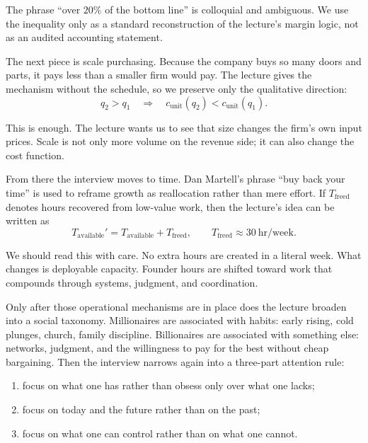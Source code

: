 \begin{remark}
The phrase ``over \(20\%\) of the bottom line'' is colloquial and ambiguous. We use the inequality only as a standard reconstruction of the lecture's margin logic, not as an audited accounting statement.
\end{remark}

The next piece is scale purchasing. Because the company buys so many doors and parts, it pays less than a smaller firm would pay. The lecture gives the mechanism without the schedule, so we preserve only the qualitative direction:
\begin{equation}
q_2 > q_1
\quad \Longrightarrow \quad
c_{\text{unit}}(q_2) < c_{\text{unit}}(q_1).
\end{equation}

This is enough. The lecture wants us to see that size changes the firm's own input prices. Scale is not only more volume on the revenue side; it can also change the cost function.

From there the interview moves to time. Dan Martell's phrase ``buy back your time'' is used to reframe growth as reallocation rather than mere effort. If \(T_{\text{freed}}\) denotes hours recovered from low-value work, then the lecture's idea can be written as
\begin{equation}
T_{\text{available}}' = T_{\text{available}} + T_{\text{freed}},
\qquad
T_{\text{freed}} \approx 30\ \text{hr/week}.
\end{equation}

We should read this with care. No extra hours are created in a literal week. What changes is deployable capacity. Founder hours are shifted toward work that compounds through systems, judgment, and coordination.

Only after those operational mechanisms are in place does the lecture broaden into a social taxonomy. Millionaires are associated with habits: early rising, cold plunges, church, family discipline. Billionaires are associated with something else: networks, judgment, and the willingness to pay for the best without cheap bargaining. Then the interview narrows again into a three-part attention rule:
\begin{enumerate}
\item focus on what one has rather than obsess only over what one lacks;
\item focus on today and the future rather than on the past;
\item focus on what one can control rather than on what one cannot.
\end{enumerate}

